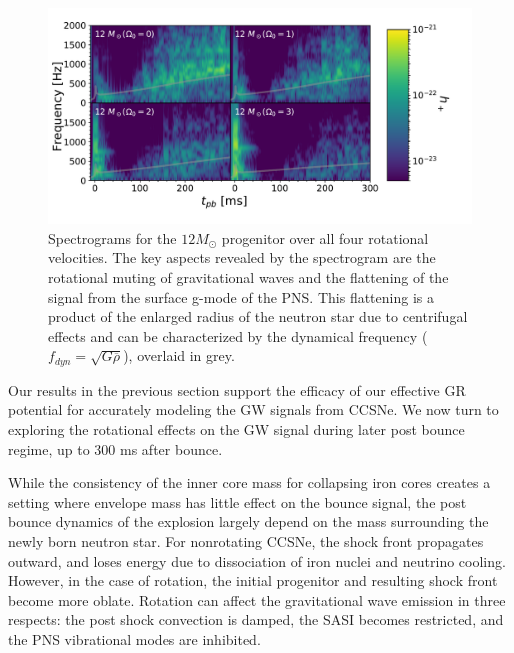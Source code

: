 \documentclass[twocolumn,times]{aastex62}  %
\begin{document}
\begin{figure}[t]
    \centering
    \includegraphics[scale=0.38]{figures/gws_2x2_line_M1.pdf}
    \caption{Spectrograms for the $12 M_\odot$ progenitor over all four rotational velocities.  The key aspects revealed by the spectrogram are the rotational muting of gravitational waves and the flattening of the signal from the surface g-mode of the PNS.  This flattening is a product of the enlarged radius of the neutron star due to centrifugal effects and can be characterized by the dynamical frequency ($f_{dyn} = \sqrt{G \overline{\rho}}$), overlaid in grey.}
    \label{fig:2x2}
\end{figure}

Our results in the previous section support the efficacy of our effective GR potential for accurately modeling the GW signals from CCSNe.
We now turn to exploring the rotational effects on the GW signal during later post bounce regime, up to 300 ms after bounce.


While the consistency of the inner core mass for collapsing iron cores creates a setting where envelope mass has little effect on the bounce signal, the post bounce dynamics of the explosion largely depend on the mass surrounding the newly born neutron star.  For nonrotating CCSNe, the shock front propagates outward, and loses energy due to dissociation of iron nuclei and neutrino cooling.  However, in the case of rotation, the initial progenitor and resulting shock front become more oblate.  Rotation can affect the gravitational wave emission in three respects: the post shock convection is damped, the SASI becomes restricted, and the PNS vibrational modes are inhibited. 
\end{document}
